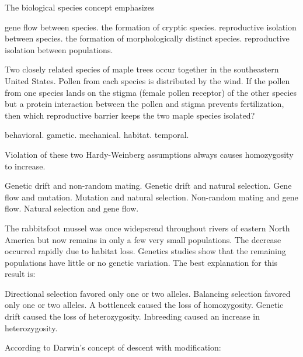 \question
The biological species concept emphasizes

\begin{choices}
\choice gene flow between species.
\choice the formation of cryptic species.
\correctchoice reproductive isolation between species.
\choice the formation of morphologically distinct species.
\choice reproductive isolation between populations.
\end{choices}


\question
Two closely related species of maple trees occur together in the southeastern United States.  Pollen from each species is distributed by the wind.  If the pollen from one species lands on the stigma (female pollen receptor) of the other species but a protein interaction between the pollen and stigma prevents fertilization, then which reproductive barrier keeps the two maple species isolated?

\begin{choices}
\choice behavioral.
\correctchoice gametic.
\choice mechanical.
\choice habitat.
\choice temporal.
\end{choices}

\question
Violation of these two Hardy-Weinberg assumptions always causes homozygosity to increase.

\begin{choices}
\correctchoice Genetic drift and non-random mating.
\choice Genetic drift and natural selection.
\choice Gene flow and mutation.
\choice Mutation and natural selection.
\choice Non-random mating and gene flow.
\choice Natural selection and gene flow.
\end{choices}

\question
The rabbitsfoot mussel was once widepsread throughout rivers of eastern North America but now remains in only a few very small populations. The decrease occurred rapidly due to habitat loss. Genetics studies show that the remaining populations have little or no genetic variation. The best explanation for this result is:

\begin{choices}
\choice Directional selection favored only one or two alleles. 
\choice Balancing selection favored only one or two alleles. 
\choice A bottleneck caused the loss of homozygosity. 
\correctchoice Genetic drift caused the loss of heterozygosity. 
\choice Inbreeding caused an increase in heterozygosity. 
\end{choices}

\question
According to Darwin's concept of descent with modification:

